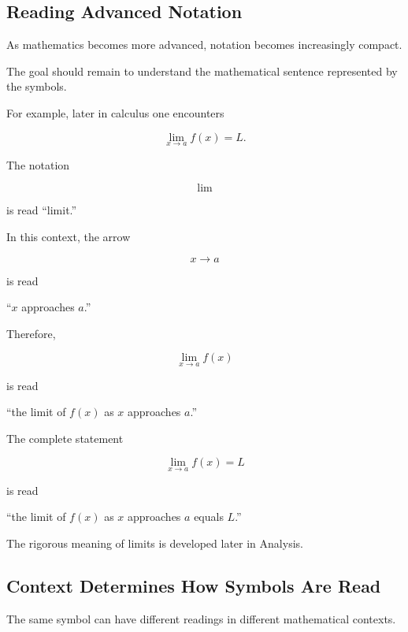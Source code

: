 \subsection{Reading Advanced Notation}
\label{subsec:reading-advanced-notation}

As mathematics becomes more advanced, notation becomes increasingly compact.

The goal should remain to understand the mathematical sentence represented by
the symbols.

For example, later in calculus one encounters

\[ \lim_{x\to a}f(x)=L. \]

The notation

\[ \lim \]

is read ``limit.''

In this context, the arrow

\[ x\to a \]

is read

\begin{center}
``\(x\) approaches \(a\).''
\end{center}

Therefore,

\[ \lim_{x\to a}f(x) \]

is read

\begin{center}
``the limit of \(f(x)\) as \(x\) approaches \(a\).''
\end{center}

The complete statement

\[ \lim_{x\to a}f(x)=L \]

is read

\begin{center}
``the limit of \(f(x)\) as \(x\) approaches \(a\) equals \(L\).''
\end{center}

The rigorous meaning of limits is developed later in Analysis.

\subsection{Context Determines How Symbols Are Read}
\label{subsec:context-symbol-reading}

The same symbol can have different readings in different mathematical
contexts.

